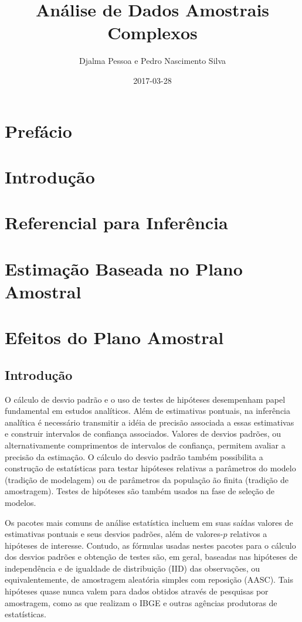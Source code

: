 \documentclass[]{book}
\title{Análise de Dados Amostrais Complexos}
\author{Djalma Pessoa e Pedro Nascimento Silva}
\date{2017-03-28}
\numberwithin{example}{chapter}
\numberwithin{remark}{chapter}
\numberwithin{definition}{chapter}
\begin{document}
\maketitle

{
\setcounter{tocdepth}{1}
\tableofcontents
}
\chapter*{Prefácio}\label{prefacio}

\chapter{Introdução}\label{introduc}

\chapter{Referencial para Inferência}\label{refinf}

\chapter{Estimação Baseada no Plano Amostral}\label{capplanamo}

\chapter{Efeitos do Plano Amostral}\label{epa}

\section{Introdução}\label{introducao}

O cálculo de desvio padrão e o uso de testes de hipóteses desempenham
papel fundamental em estudos analíticos. Além de estimativas pontuais,
na inferência analítica é necessário transmitir a idéia de precisão
associada a essas estimativas e construir intervalos de confiança
associados. Valores de desvios padrões, ou alternativamente comprimentos
de intervalos de confiança, permitem avaliar a precisão da estimação. O
cálculo do desvio padrão também possibilita a construção de estatísticas
para testar hipóteses relativas a parâmetros do modelo (tradição de
modelagem) ou de parâmetros da população ão finita (tradição de
amostragem). Testes de hipóteses são também usados na fase de seleção de
modelos.

Os pacotes mais comuns de análise estatística incluem em suas saídas
valores de estimativas pontuais e seus desvios padrões, além de
valores-\(p\) relativos a hipóteses de interesse. Contudo, as fórmulas
usadas nestes pacotes para o cálculo dos desvios padrões e obtenção de
testes são, em geral, baseadas nas hipóteses de independência e de
igualdade de distribuição (IID) das observações, ou equivalentemente, de
amostragem aleatória simples com reposição (AASC). Tais hipóteses quase
nunca valem para dados obtidos através de pesquisas por amostragem, como
as que realizam o IBGE e outras agências produtoras de estatísticas.
\end{document}
